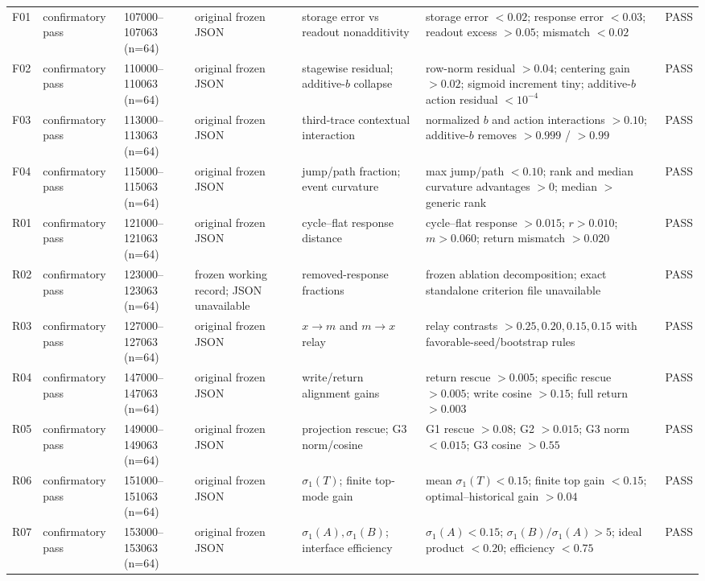 \documentclass[11pt]{article}
\begin{document}
\begin{landscape}
\begin{longtable}{p{0.65cm}p{2.25cm}p{2.55cm}p{3.15cm}p{3.9cm}p{6.1cm}p{2.2cm}}
F01 & confirmatory pass & 107000--107063 (n=64) & original frozen JSON & storage error vs readout nonadditivity & storage error $<0.02$; response error $<0.03$; readout excess $>0.05$; mismatch $<0.02$ & PASS \\
F02 & confirmatory pass & 110000--110063 (n=64) & original frozen JSON & stagewise residual; additive-$b$ collapse & row-norm residual $>0.04$; centering gain $>0.02$; sigmoid increment tiny; additive-$b$ action residual $<10^{-4}$ & PASS \\
F03 & confirmatory pass & 113000--113063 (n=64) & original frozen JSON & third-trace contextual interaction & normalized $b$ and action interactions $>0.10$; additive-$b$ removes $>0.999$ / $>0.99$ & PASS \\
F04 & confirmatory pass & 115000--115063 (n=64) & original frozen JSON & jump/path fraction; event curvature & max jump/path $<0.10$; rank and median curvature advantages $>0$; median $>$ generic rank & PASS \\
R01 & confirmatory pass & 121000--121063 (n=64) & original frozen JSON & cycle--flat response distance & cycle--flat response $>0.015$; $r>0.010$; $m>0.060$; return mismatch $>0.020$ & PASS \\
R02 & confirmatory pass & 123000--123063 (n=64) & frozen working record; JSON unavailable & removed-response fractions & frozen ablation decomposition; exact standalone criterion file unavailable & PASS \\
R03 & confirmatory pass & 127000--127063 (n=64) & original frozen JSON & $x\to m$ and $m\to x$ relay & relay contrasts $>0.25,0.20,0.15,0.15$ with favorable-seed/bootstrap rules & PASS \\
R04 & confirmatory pass & 147000--147063 (n=64) & original frozen JSON & write/return alignment gains & return rescue $>0.005$; specific rescue $>0.005$; write cosine $>0.15$; full return $>0.003$ & PASS \\
R05 & confirmatory pass & 149000--149063 (n=64) & original frozen JSON & projection rescue; G3 norm/cosine & G1 rescue $>0.08$; G2 $>0.015$; G3 norm $<0.015$; G3 cosine $>0.55$ & PASS \\
R06 & confirmatory pass & 151000--151063 (n=64) & original frozen JSON & $\sigma_1(T)$; finite top-mode gain & mean $\sigma_1(T)<0.15$; finite top gain $<0.15$; optimal--historical gain $>0.04$ & PASS \\
R07 & confirmatory pass & 153000--153063 (n=64) & original frozen JSON & $\sigma_1(A),\sigma_1(B)$; interface efficiency & $\sigma_1(A)<0.15$; $\sigma_1(B)/\sigma_1(A)>5$; ideal product $<0.20$; efficiency $<0.75$ & PASS \\

\end{longtable}
\end{landscape}
\end{document}
